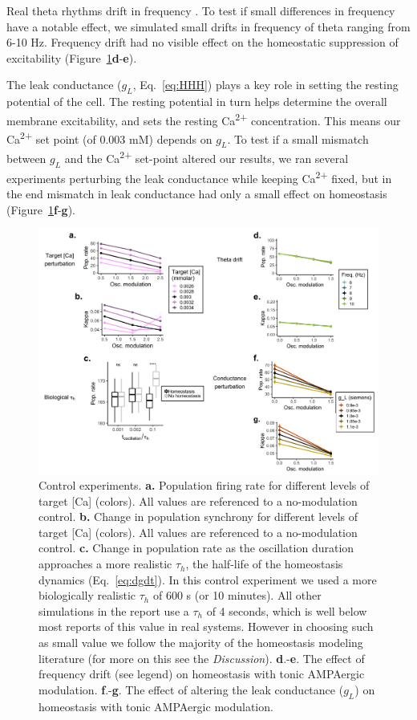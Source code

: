 \documentclass{article}
\begin{document}
Real theta rhythms drift in frequency \cite{Buzsaki2015,Jacobs2014}. To test if small differences in frequency have a notable effect, we simulated small drifts in frequency of theta ranging from 6-10 Hz. Frequency drift had no visible effect on the homeostatic suppression of excitability (Figure~\ref{fig:f5}\textbf{d}-\textbf{e}).

The leak conductance ($g_L$, Eq.~\ref{eq:HHH}) plays a key role in setting the resting potential of the cell. The resting potential in turn helps determine the overall membrane excitability, and sets the resting Ca\textsuperscript{2+} concentration. This means our Ca\textsuperscript{2+} set point (of 0.003 mM) depends on $g_L$. To test if a small mismatch between $g_L$ and the Ca\textsuperscript{2+} set-point altered our results, we ran several experiments perturbing the leak conductance while keeping Ca\textsuperscript{2+} fixed, but in the end mismatch in leak conductance had only a small effect on homeostasis (Figure~\ref{fig:f5}\textbf{f}-\textbf{g}).

\begin{figure}
\centering
\includegraphics[width=1\textwidth]{fig5.png}
\caption{\label{fig:f5}
    Control experiments.
    \textbf{a.} Population firing rate for different levels of target [Ca] (colors). All values are referenced to a no-modulation control.
    \textbf{b.} Change in population synchrony for different levels of target [Ca] (colors). All values are referenced to a no-modulation control.
    \textbf{c.} Change in population rate as the oscillation duration approaches a more realistic $\tau_h$, the half-life of the homeostasis dynamics (Eq.~\ref{eq:dgdt}). In this control experiment we used a more biologically realistic $\tau_h$ of 600 s (or 10 minutes). All other simulations in the report use a $\tau_h$ of 4 seconds, which is well below most reports of this value in real systems. However in choosing such as small value we follow the majority of the homeostasis modeling literature (for more on this see the \textit{Discussion}).
    \textbf{d}.-\textbf{e}. The effect of frequency drift (see legend) on homeostasis with tonic AMPAergic modulation.
    \textbf{f}.-\textbf{g}. The effect of altering the leak conductance ($g_L$) on homeostasis with tonic AMPAergic modulation.
}
\end{figure}
\end{document}

